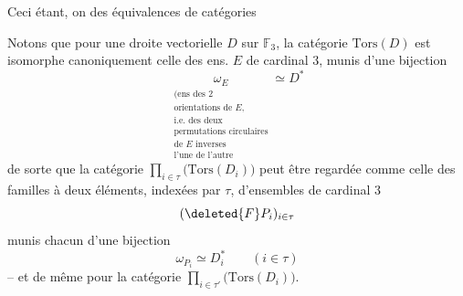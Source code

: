 Ceci étant, on  des équivalences de catégories


Notons que pour une droite vectorielle $D$ sur $\mathbb F_3$, la catégorie $\mathrm{Tors}(D)$ est isomorphe canoniquement  celle des ens. $E$ de cardinal $3$, munis d'une bijection
\[
\underset{\substack{\text{(ens des 2}\\\text{orientations de }E,\\
\text{i.e. des deux}\\\text{permutations circulaires}\\
\text{de }E\text{ inverses}\\\text{l'une de l'autre}}}{\omega_E}
 \simeq D^{*}
\]
de sorte que la catégorie $\prod_{i\in\tau}\bigl(\mathrm{Tors}(D_i)\bigr)$ peut être regardée comme celle des familles à deux éléments, indexées par $\tau$, d'ensembles de cardinal $3$
\[
(\deleted{F}P_i)_{i\in\tau}
\]
munis chacun d'une bijection
\[
\omega_{P_i}\simeq D_i^{*}\qquad(i\in\tau)
\]
-- et de même pour la catégorie $\prod_{i\in\tau'}\bigl(\mathrm{Tors}(D_i)\bigr)$.
